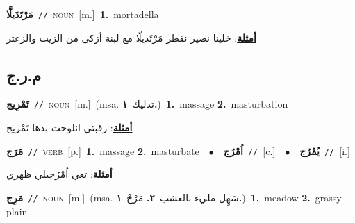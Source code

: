 \documentclass[10pt,a4paper,twoside]{article} %
\begin{document}
\begin{multicols}{2}
{\setlength\topsep{0pt}\textbf{\foreignlanguage{arabic}{مَرْتَدَيلَّا}}\ {\color{gray}\texttt{//}\color{black}}\ \textsc{noun}\ [m.]\ \textbf{1.}~mortadella\  \begin{flushright}\color{gray}\foreignlanguage{arabic}{\textbf{\underline{\foreignlanguage{arabic}{أمثلة}}}: خلينا نصير نفطر مَرْتَديلّا مع لبنة أزكى من الزيت والزعتر}\end{flushright}\color{black}} \vspace{2mm}

\vspace{-3mm}
\subsection*{\color{blue}\foreignlanguage{arabic}{م.ر.ج}\color{blue}{}} 

{\setlength\topsep{0pt}\textbf{\foreignlanguage{arabic}{تَمْرِيج}}\ {\color{gray}\texttt{//}\color{black}}\ \textsc{noun}\ [m.]\ \color{gray}(msa. \foreignlanguage{arabic}{تدليك}~\foreignlanguage{arabic}{\textbf{١.}})\color{black}\ \textbf{1.}~massage  \textbf{2.}~masturbation\  \begin{flushright}\color{gray}\foreignlanguage{arabic}{\textbf{\underline{\foreignlanguage{arabic}{أمثلة}}}: رقبتي انلوحت بدها تَمْريج}\end{flushright}\color{black}} \vspace{2mm}

{\setlength\topsep{0pt}\textbf{\foreignlanguage{arabic}{مَرَج}}\ {\color{gray}\texttt{//}\color{black}}\ \textsc{verb}\ [p.]\ \textbf{1.}~massage  \textbf{2.}~masturbate\ \ $\bullet$\ \ \setlength\topsep{0pt}\textbf{\foreignlanguage{arabic}{اُمْرُج}}\ {\color{gray}\texttt{//}\color{black}}\ [c.]\ \ $\bullet$\ \ \setlength\topsep{0pt}\textbf{\foreignlanguage{arabic}{يُمْرُج}}\ {\color{gray}\texttt{//}\color{black}}\ [i.]\  \begin{flushright}\color{gray}\foreignlanguage{arabic}{\textbf{\underline{\foreignlanguage{arabic}{أمثلة}}}: تعي اُمْرُجيلي ظهري}\end{flushright}\color{black}} \vspace{2mm}

{\setlength\topsep{0pt}\textbf{\foreignlanguage{arabic}{مَرِج}}\ {\color{gray}\texttt{//}\color{black}}\ \textsc{noun}\ [m.]\ \color{gray}(msa. \foreignlanguage{arabic}{سَهِل مليء بالعشب}~\foreignlanguage{arabic}{\textbf{٢.}}  \foreignlanguage{arabic}{مَرْجْ}~\foreignlanguage{arabic}{\textbf{١.}})\color{black}\ \textbf{1.}~meadow  \textbf{2.}~grassy plain\ } \vspace{2mm}


\end{multicols}
\end{document}
